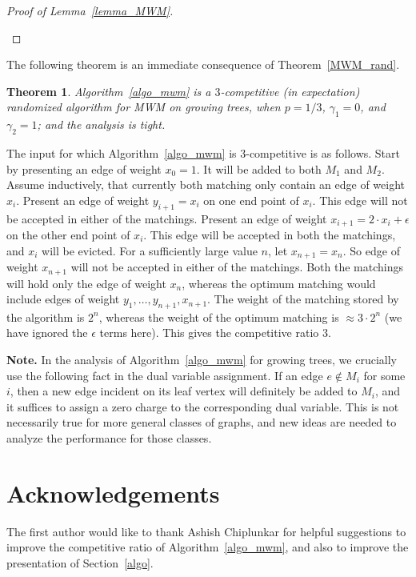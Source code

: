\documentclass[11pt]{article}
\newtheorem{theorem}{Theorem}
\begin{document}
\begin{proof}[Proof of Lemma~\ref{lemma_MWM}]
\begin{enumerate}

\end{enumerate}
\end{proof}
The following theorem is an immediate consequence of Theorem~\ref{MWM_rand}.
\begin{theorem}\label{ub_MWM}
Algorithm~\ref{algo_mwm} is a $3$-competitive (in expectation) randomized algorithm for MWM on growing trees, when $p=1/3$, $\gamma_1=0$, and $\gamma_2=1$; and the analysis is tight.
\end{theorem}
The input for which Algorithm~\ref{algo_mwm} is $3$-competitive is as follows. Start by presenting an edge of weight $x_0=1$. It will be added to both $M_1$ and $M_2$. Assume inductively, that currently both matching only contain an edge of weight $x_i$. Present an edge of weight $y_{i+1}=x_i$ on one end point of $x_i$. This edge will not be accepted in either of the matchings. Present an edge of weight $x_{i+1}=2\cdot x_i + \epsilon$ on the other end point of $x_i$. This edge will be accepted in  both the  matchings, and $x_i$ will be evicted. For a sufficiently large value $n$, let $x_{n+1}=x_n$. So edge of weight $x_{n+1}$ will not be accepted in either of the matchings. Both the matchings will hold only the edge of weight $x_n$, whereas the optimum matching would include edges of weight $y_1,\dots,y_{n+1},x_{n+1}$. The weight of the matching stored by the algorithm is $2^n$, whereas the weight of the optimum matching is $\approx 3\cdot 2^n$ (we have ignored the $\epsilon$ terms here). This gives the competitive ratio $3$.

\textbf{Note.} In the analysis of Algorithm~\ref{algo_mwm} for growing trees, we crucially use the  following fact in the dual variable assignment. If an edge $e\notin M_i$ for some $i$, then a new edge incident on its leaf vertex will definitely be added to $M_i$, and it suffices to assign a zero charge to the corresponding dual variable. This is not necessarily true for more general classes of graphs, and new ideas are needed to analyze the performance for those classes.

\section*{Acknowledgements}
The first author would like to thank Ashish Chiplunkar for helpful suggestions to improve the competitive ratio of Algorithm~\ref{algo_mwm}, and also to improve the presentation of Section~\ref{algo}.
\end{document}
